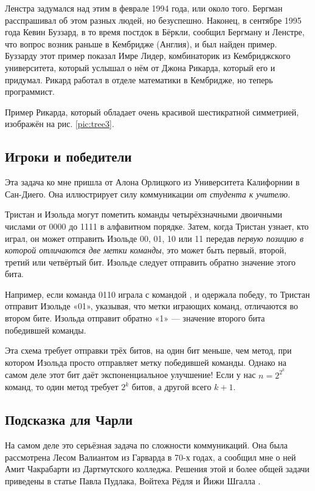 Ленстра задумался над этим в феврале 1994 года, или около того.
Бергман расспрашивал об этом разных людей, но безуспешно.
Наконец, в сентябре 1995 года Кевин Буззард, в то время постдок в Бёркли, сообщил Бергману и Ленстре, что вопрос возник раньше в Кембридже (Англия), и был найден пример.
Буззарду этот пример показал Имре Лидер, комбинаторик из Кембриджского университета, который услышал о нём от Джона Рикарда, который его и придумал.
Рикард работал в отделе математики в Кембридже, но теперь программист.

Пример Рикарда, который обладает очень красивой шестикратной симметрией, изображён на рис. \ref{pic:tree3}.

\subsection*{Игроки и победители}

Эта задача ко мне пришла от Алона Орлицкого из Университета Калифорнии в Сан-Диего.
Она иллюстрирует силу коммуникации \emph{от студента к учителю}.

Тристан и Изольда могут пометить команды четырёхзначными двоичными числами от 0000 до 1111 в алфавитном порядке. Затем, когда Тристан узнает, кто играл, он может отправить Изольде 00, 01, 10 или 11 передав \emph{первую позицию в которой отличаются две метки команды}, это может быть первый, второй, третий или четвёртый бит.
Изольде следует отправить обратно значение этого бита.

Например, если команда 0110 играла с командой , и одержала победу,
то Тристан отправит Изольде «01», указывая, что метки играющих команд, отличаются во втором бите.
Изольда отправит обратно «1» --- значение второго бита победившей команды.

Эта схема требует отправки трёх битов, на один бит меньше, чем метод, при котором Изольда просто отправляет метку победившей команды.
Однако на самом деле этот бит даёт экспоненциальное улучшение!
Если у нас $n = 2^{2^k}$ команд, то один метод требует $2^k$ битов, а другой всего $k + 1$.



\subsection*{Подсказка для Чарли}

На самом деле это серьёзная задача по сложности коммуникаций.
Она была рассмотрена Лесом Валиантом из Гарварда в 70-х годах,
а сообщил мне о ней Амит Чакрабарти из Дартмутского колледжа.
Решения этой и более общей задачи приведены в статье Павла Пудлака, Войтеха Рёдля и Йижи Шгалла \cite{49}.


